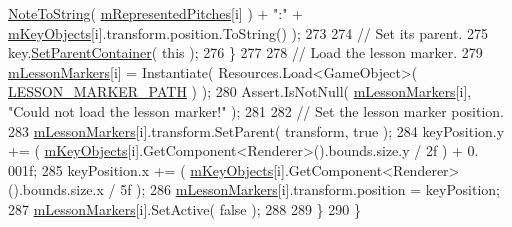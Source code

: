 \begin{DoxyCode}
      \hyperlink{group___music_stat_func_ga85a22c905d56d4c5f4e62159bfecee8c}{NoteToString}( \hyperlink{group___key_contain_priv_var_ga103945a6efe3469191e5253d13fec5be}{mRepresentedPitches}[i] ) + \textcolor{stringliteral}{":"} + 
      \hyperlink{group___key_contain_priv_var_ga01addf187bb12ffe824374df98e2c2d8}{mKeyObjects}[i].transform.position.ToString() );
273 
274                 \textcolor{comment}{// Set its parent.}
275                 key.\hyperlink{group___white_key_pub_func_gab926585e88db73a20431ac93d979b61d}{SetParentContainer}( \textcolor{keyword}{this} );
276             \}
277 
278             \textcolor{comment}{// Load the lesson marker.}
279             \hyperlink{group___key_contain_priv_var_gaf21490115ecf2b80c1bd382d7469a08c}{mLessonMarkers}[i] = Instantiate( Resources.Load<GameObject>( 
      \hyperlink{group___key_contain_const_ga4caccd17bb57caca66047951046aa44a}{LESSON\_MARKER\_PATH} ) );
280             Assert.IsNotNull( \hyperlink{group___key_contain_priv_var_gaf21490115ecf2b80c1bd382d7469a08c}{mLessonMarkers}[i], \textcolor{stringliteral}{"Could not load the lesson marker!"} );
281 
282             \textcolor{comment}{// Set the lesson marker position.}
283             \hyperlink{group___key_contain_priv_var_gaf21490115ecf2b80c1bd382d7469a08c}{mLessonMarkers}[i].transform.SetParent( transform, \textcolor{keyword}{true} );
284             keyPosition.y += ( \hyperlink{group___key_contain_priv_var_ga01addf187bb12ffe824374df98e2c2d8}{mKeyObjects}[i].GetComponent<Renderer>().bounds.size.y / 2f ) + 0.
      001f;
285             keyPosition.x += ( \hyperlink{group___key_contain_priv_var_ga01addf187bb12ffe824374df98e2c2d8}{mKeyObjects}[i].GetComponent<Renderer>().bounds.size.x / 5f );
286             \hyperlink{group___key_contain_priv_var_gaf21490115ecf2b80c1bd382d7469a08c}{mLessonMarkers}[i].transform.position = keyPosition;
287             \hyperlink{group___key_contain_priv_var_gaf21490115ecf2b80c1bd382d7469a08c}{mLessonMarkers}[i].SetActive( \textcolor{keyword}{false} );
288 
289         \}
290     \}
\end{DoxyCode}
